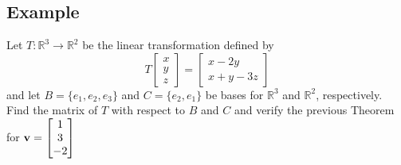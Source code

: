\subsection*{Example}
Let $T:\mathbb{R}^3\to\mathbb{R}^2$ be the linear transformation defined by
\[
    T\begin{bmatrix}
        x \\y\\z
    \end{bmatrix}=\begin{bmatrix}
        x-2y \\
        x+y-3z
    \end{bmatrix}
\]
and let $B = \{e_1, e_2, e_3\}$ and $C = \{e_2, e_1\}$ be bases for $\mathbb{R}^3$ and
$\mathbb{R}^2$, respectively. Find the matrix of $T$ with respect to $B$ and $C$
and verify the previous Theorem for $\mathbf{v}=\begin{bmatrix}
        1 \\3\\-2
    \end{bmatrix}$

